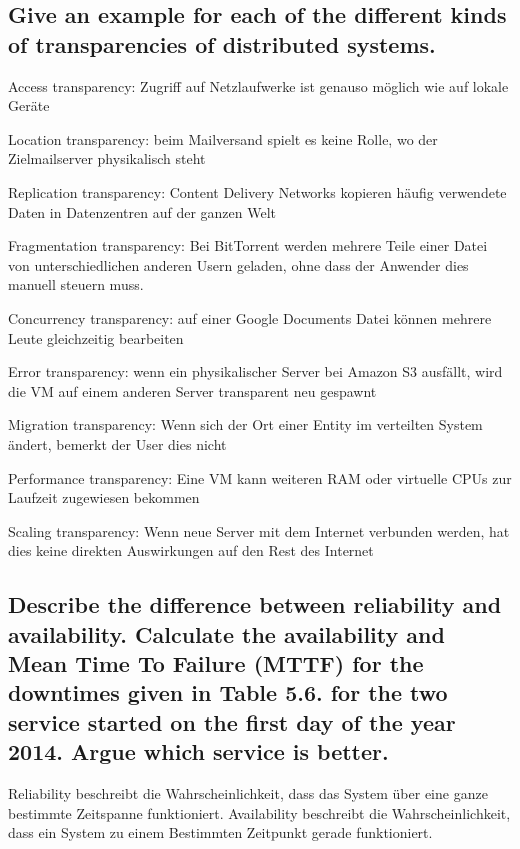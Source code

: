 \documentclass[a4paper,
			llpt,
			solution,
			accentcolor=tud2d,
			colorbacktitle
			]
			{tudexercise}
\begin{document}
\subsection{Give an example for each of the different kinds of transparencies of distributed systems.}
\begin{compactitem}
	\item Access transparency: Zugriff auf Netzlaufwerke ist genauso möglich wie auf lokale Geräte
	\item Location transparency: beim Mailversand spielt es keine Rolle, wo der Zielmailserver physikalisch steht
	\item Replication transparency: Content Delivery Networks kopieren häufig verwendete Daten in Datenzentren auf der ganzen Welt
	\item Fragmentation transparency: Bei BitTorrent werden mehrere Teile einer Datei von unterschiedlichen anderen Usern geladen, ohne dass der Anwender dies manuell steuern muss.
	\item Concurrency transparency: auf einer Google Documents Datei können mehrere Leute gleichzeitig bearbeiten
	\item Error transparency: wenn ein physikalischer Server bei Amazon S3 ausfällt, wird die VM auf einem anderen Server transparent neu gespawnt
	\item Migration transparency: Wenn sich der Ort einer Entity im verteilten System ändert, bemerkt der User dies nicht
	\item Performance transparency: Eine VM kann weiteren RAM oder virtuelle CPUs zur Laufzeit zugewiesen bekommen
	\item Scaling transparency: Wenn neue Server mit dem Internet verbunden werden, hat dies keine direkten Auswirkungen auf den Rest des Internet
\end{compactitem}


\subsection{Describe the difference between reliability and availability. Calculate the availability and Mean Time To Failure (MTTF) for the downtimes given in Table 5.6. for the two service started on the first day of the year 2014. Argue which service is better.}

Reliability beschreibt die Wahrscheinlichkeit, dass das System über eine ganze bestimmte Zeitspanne funktioniert. Availability beschreibt die Wahrscheinlichkeit, dass ein System zu einem Bestimmten Zeitpunkt gerade funktioniert.
\end{document}
